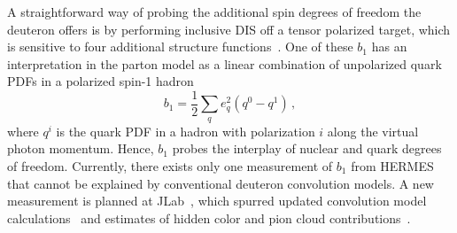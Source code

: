 A straightforward way of probing the additional spin degrees of freedom the deuteron offers is by performing inclusive DIS off a tensor polarized target, which is sensitive to four additional structure functions~\cite{Hoodbhoy:1988am}.  One of these $b_1$ has an interpretation in the parton model as a linear combination of unpolarized quark PDFs in a polarized spin-1 hadron
\begin{equation}
b_1=\frac{1}{2}\sum_q e_q^2(q^0-q^1)\,,
\end{equation}
where $q^i$ is the quark PDF in a hadron with polarization $i$ along the virtual photon momentum.  Hence, $b_1$ probes the interplay of nuclear and quark degrees of freedom.  Currently, there exists only one measurement of $b_1$ from HERMES~\cite{Airapetian:2005cb} that cannot be explained by conventional deuteron convolution models.  A new measurement is planned at JLab~\cite{Slifer:2013vma}, which spurred updated convolution model calculations~\cite{Cosyn:2017fbo} and estimates of hidden color and pion cloud contributions~\cite{Miller:2013hla}.
